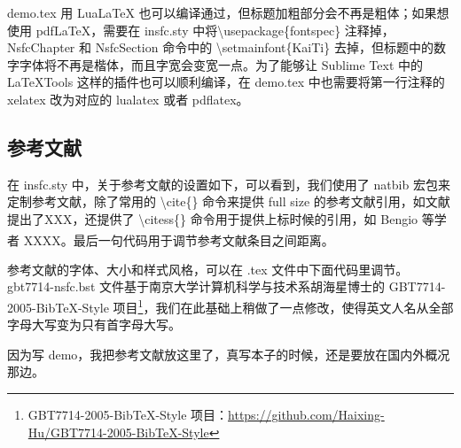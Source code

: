 \documentclass[a4paper,cs4size]{article}
\newcommand{\citess}[1]{\textsuperscript{\cite{#1}}}
\begin{document}
demo.tex 用 LuaLaTeX 也可以编译通过，但标题加粗部分会不再是粗体；如果想使用 pdfLaTeX，需要在 insfc.sty 中将\textbackslash usepackage\{fontspec\} 注释掉，NsfcChapter 和 NsfcSection 命令中的 \textbackslash setmainfont\{KaiTi\} 去掉，但标题中的数字字体将不再是楷体，而且字宽会变宽一点。为了能够让 Sublime Text 中的 LaTeXTools 这样的插件也可以顺利编译，在 demo.tex 中也需要将第一行注释的 xelatex 改为对应的 lualatex 或者 pdflatex。

\subsection{参考文献}
在 insfc.sty 中，关于参考文献的设置如下，可以看到，我们使用了 natbib 宏包来定制参考文献，除了常用的 \textbackslash cite\{\} 命令来提供 full size 的参考文献引用，如文献\cite{li2014object}提出了XXX，还提供了 \textbackslash citess\{\} 命令用于提供上标时候的引用，如 Bengio 等学者\citess{bengio2013representation} XXXX。最后一句代码用于调节参考文献条目之间距离。

参考文献的字体、大小和样式风格，可以在 .tex 文件中下面代码里调节。gbt7714-nsfc.bst 文件基于南京大学计算机科学与技术系胡海星博士的 GBT7714-2005-BibTeX-Style 项目\footnote{GBT7714-2005-BibTeX-Style 项目：\href{https://github.com/Haixing-Hu/GBT7714-2005-BibTeX-Style}{https://github.com/Haixing-Hu/GBT7714-2005-BibTeX-Style}}，我们在此基础上稍做了一点修改，使得英文人名从全部字母大写变为只有首字母大写。


因为写 demo，我把参考文献放这里了，真写本子的时候，还是要放在国内外概况那边。

\begin{spacing}{1.3} %
   \songti   
  
    
  \vspace{11bp}
\end{spacing}
\end{document}
